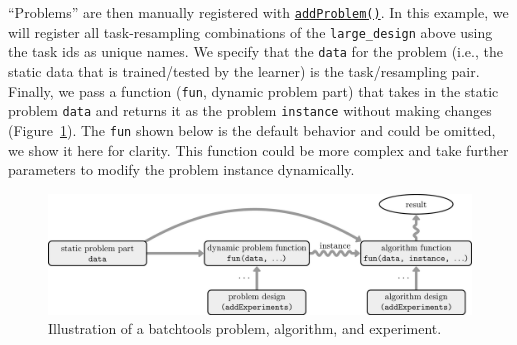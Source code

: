 ``Problems'' are then manually registered with
\href{https://www.rdocumentation.org/packages/batchtools/topics/addProblem}{\texttt{addProblem()}}.
In this example, we will register all task-resampling combinations of
the \texttt{large\_design} above using the task ids as unique names. We
specify that the \texttt{data} for the problem (i.e., the static data
that is trained/tested by the learner) is the task/resampling pair.
Finally, we pass a function (\texttt{fun}, dynamic problem part) that
takes in the static problem \texttt{data} and returns it as the problem
\texttt{instance} without making changes
(Figure~\ref{fig-batchtools-illustration}). The \texttt{fun} shown below
is the default behavior and could be omitted, we show it here for
clarity. This function could be more complex and take further parameters
to modify the problem instance dynamically.

\begin{Shaded}
\begin{Highlighting}[]
 
  \NormalTok{(}
    \SpecialCharTok{$}
     \NormalTok{(}
     
\NormalTok{  )}
\NormalTok{\}}
\end{Highlighting}
\end{Shaded}

\begin{figure}

{\centering \includegraphics[width=1\textwidth,height=\textheight]{chapters/chapter11/Figures/mlr3book_figures-31.png}

}

\caption{\label{fig-batchtools-illustration}Illustration of a batchtools
problem, algorithm, and experiment.}

\end{figure}

